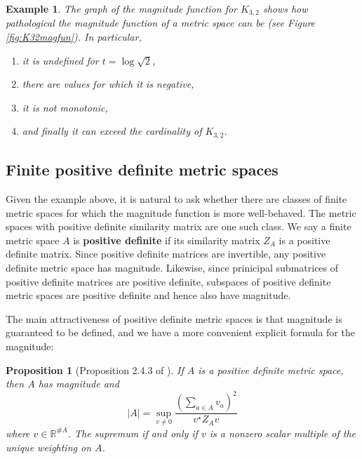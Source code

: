 \documentclass[11pt]{article}
\theoremstyle{mythm}
\newtheorem{ex}[defn]{Example}
\newtheorem{prop}[defn]{Proposition}
\begin{document}
\begin{ex}
The graph of the magnitude function for $K_{3,2}$ shows how pathological the magnitude function of a metric space can be (see Figure \ref{fig:K32magfun}). In particular,
\begin{enumerate}[label=\arabic*.]
\item it is undefined for $t = \log{\sqrt{2}}$,
\item there are values for which it is negative,
\item it is not monotonic,
\item and finally it can exceed the cardinality of $K_{3,2}$.
\end{enumerate}
\end{ex}

\subsection{Finite positive definite metric spaces}

Given the example above, it is natural to ask whether there are classes of finite metric spaces for which the magnitude function is more well-behaved. The metric spaces with positive definite similarity matrix are one such class. We say a finite metric space $A$ is \textbf{positive definite} if its similarity matrix $Z_A$ is a positive definite matrix. Since positive definite matrices are invertible, any positive definite metric space has magnitude. Likewise, since prinicipal submatrices of positive definite matrices are positive definite, subspaces of positive definite metric spaces are positive definite and hence also have magnitude.

The main attractiveness of positive definite metric spaces is that magnitude is guaranteed to be defined, and we have a more convenient explicit formula for the magnitude:

\begin{prop}[Proposition 2.4.3 of \cite{leinster_magnitude_2011}]\label{prop:finiteposdefsup}
If $A$ is a positive definite metric space, then $A$ has magnitude and
\begin{equation*}
\vert A \vert = \sup\limits_{v \neq 0}\frac{\left(\sum_{a\in A}v_a\right)^2}{v^\star Z_Av}
\end{equation*}
where $v \in \mathbb{R}^{\#A}$. The supremum if and only if $v$ is a nonzero scalar multiple of the unique weighting on $A$.
\end{prop}
\end{document}
